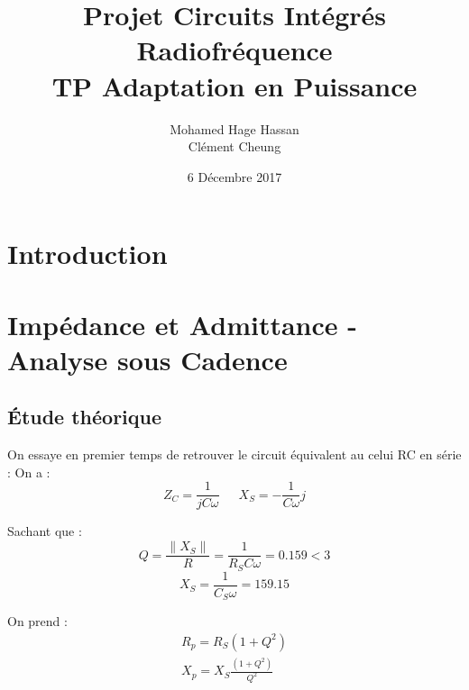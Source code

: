 \documentclass[a4paper]{article}
\begin{document}
\newcommand\textstyleEmphasis[1]{\textit{#1}}
\renewcommand{\contentsname}{Table des mati\`eres}
\renewcommand\refname{R\'ef\'erences}

\renewcommand{\abstractname}{Pr\'eambule}
\title{\textbf{Projet Circuits Int\'egr\'es Radiofr\'equence \\ TP Adaptation en Puissance}}
\author{Mohamed Hage Hassan \\ Cl\'ement Cheung}
\date{6 D\'ecembre 2017}
\maketitle
\thispagestyle{empty}

\tableofcontents
\clearpage

\section{Introduction}

\section{Imp\'edance et Admittance - Analyse sous Cadence}
\subsection{\'Etude th\'eorique}

On essaye en premier temps de retrouver le circuit \'equivalent au celui RC en s\'erie :
On a :
\begin{equation}
  Z_C = \frac{1}{jC\omega} \phantom{8} \phantom{8} \phantom{8} X_S = - \frac{1}{C\omega}j
\end{equation}

Sachant que :
\[
Q = \frac{\|X_S \|}{R} = \frac{1}{R_S C\omega} = 0.159 < 3
\]
\[
X_S = \frac{1}{C_S \omega} = 159.15
\]

On prend :
\begin{equation}
  \begin{split}
  R_p = R_S (1 + Q^2) \\
  X_p = X_S \frac{(1+Q^2)}{Q^2}
  \end{split}
\end{equation}
\end{document}
